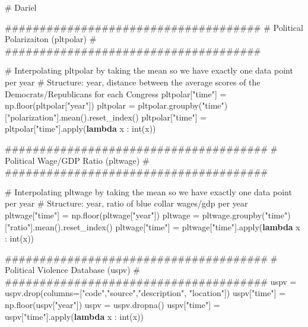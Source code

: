 \documentclass[
  letterpaper,
  DIV=11,
  numbers=noendperiod]{scrartcl}
\newenvironment{Shaded}{\begin{snugshade}}{\end{snugshade}}
\newcommand{\BuiltInTok}[1]{\textcolor[rgb]{0.00,0.23,0.31}{#1}}
\newcommand{\CommentTok}[1]{\textcolor[rgb]{0.37,0.37,0.37}{#1}}
\newcommand{\KeywordTok}[1]{\textcolor[rgb]{0.00,0.23,0.31}{\textbf{#1}}}
\newcommand{\NormalTok}[1]{\textcolor[rgb]{0.00,0.23,0.31}{#1}}
\newcommand{\OperatorTok}[1]{\textcolor[rgb]{0.37,0.37,0.37}{#1}}
\newcommand{\StringTok}[1]{\textcolor[rgb]{0.13,0.47,0.30}{#1}}
\begin{document}
\begin{Shaded}
\begin{Highlighting}[]
\CommentTok{\# Dariel}

\CommentTok{\#\#\#\#\#\#\#\#\#\#\#\#\#\#\#\#\#\#\#\#\#\#\#\#\#\#\#\#\#\#\#\#\#\#\#\#\#}
\CommentTok{\# Political Polarizaiton (pltpolar) \#}
\CommentTok{\#\#\#\#\#\#\#\#\#\#\#\#\#\#\#\#\#\#\#\#\#\#\#\#\#\#\#\#\#\#\#\#\#\#\#\#\#}

\CommentTok{\# Interpolating pltpolar by taking the mean so we have exactly one data point per year}
\CommentTok{\# Structure: year, distance between the average scores of the Democrats/Republicans for each Congress}
\NormalTok{pltpolar[}\StringTok{"time"}\NormalTok{] }\OperatorTok{=}\NormalTok{ np.floor(pltpolar[}\StringTok{"year"}\NormalTok{])}
\NormalTok{pltpolar }\OperatorTok{=}\NormalTok{ pltpolar.groupby(}\StringTok{"time"}\NormalTok{)[}\StringTok{"polarization"}\NormalTok{].mean().reset\_index()}
\NormalTok{pltpolar[}\StringTok{"time"}\NormalTok{] }\OperatorTok{=}\NormalTok{ pltpolar[}\StringTok{"time"}\NormalTok{].}\BuiltInTok{apply}\NormalTok{(}\KeywordTok{lambda}\NormalTok{ x : }\BuiltInTok{int}\NormalTok{(x))}

\CommentTok{\#\#\#\#\#\#\#\#\#\#\#\#\#\#\#\#\#\#\#\#\#\#\#\#\#\#\#\#\#\#\#\#\#\#\#\#\#\#}
\CommentTok{\# Political Wage/GDP Ratio (pltwage) \#}
\CommentTok{\#\#\#\#\#\#\#\#\#\#\#\#\#\#\#\#\#\#\#\#\#\#\#\#\#\#\#\#\#\#\#\#\#\#\#\#\#\#}

\CommentTok{\# Interpolating pltwage by taking the mean so we have exactly one data point per year}
\CommentTok{\# Structure: year, ratio of blue collar wages/gdp per year}
\NormalTok{pltwage[}\StringTok{"time"}\NormalTok{] }\OperatorTok{=}\NormalTok{ np.floor(pltwage[}\StringTok{"year"}\NormalTok{])}
\NormalTok{pltwage }\OperatorTok{=}\NormalTok{ pltwage.groupby(}\StringTok{"time"}\NormalTok{)[}\StringTok{"ratio"}\NormalTok{].mean().reset\_index()}
\NormalTok{pltwage[}\StringTok{"time"}\NormalTok{] }\OperatorTok{=}\NormalTok{ pltwage[}\StringTok{"time"}\NormalTok{].}\BuiltInTok{apply}\NormalTok{(}\KeywordTok{lambda}\NormalTok{ x : }\BuiltInTok{int}\NormalTok{(x))}

\CommentTok{\#\#\#\#\#\#\#\#\#\#\#\#\#\#\#\#\#\#\#\#\#\#\#\#\#\#\#\#\#\#\#\#\#\#\#\#\#\#}
\CommentTok{\# Political Violence Database (uspv) \#}
\CommentTok{\#\#\#\#\#\#\#\#\#\#\#\#\#\#\#\#\#\#\#\#\#\#\#\#\#\#\#\#\#\#\#\#\#\#\#\#\#\#}
\NormalTok{uspv }\OperatorTok{=}\NormalTok{ uspv.drop(columns}\OperatorTok{=}\NormalTok{[}\StringTok{"code"}\NormalTok{,}\StringTok{"source"}\NormalTok{,}\StringTok{"description"}\NormalTok{, }\StringTok{"location"}\NormalTok{])}
\NormalTok{uspv[}\StringTok{"time"}\NormalTok{] }\OperatorTok{=}\NormalTok{ np.floor(uspv[}\StringTok{"year"}\NormalTok{])}
\NormalTok{uspv }\OperatorTok{=}\NormalTok{ uspv.dropna()}
\NormalTok{uspv[}\StringTok{"time"}\NormalTok{] }\OperatorTok{=}\NormalTok{ uspv[}\StringTok{"time"}\NormalTok{].}\BuiltInTok{apply}\NormalTok{(}\KeywordTok{lambda}\NormalTok{ x : }\BuiltInTok{int}\NormalTok{(x))}


\end{Highlighting}
\end{Shaded}
\end{document}

